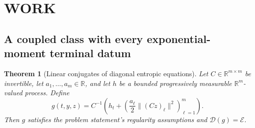 \documentclass[11pt,a4paper]{article}
\newtheorem{theorem}{Theorem}[section]
\theoremstyle{definition}
\theoremstyle{remark}
\begin{document}
\section{WORK}
\subsection{A coupled class with every exponential-moment terminal datum}
\begin{theorem}[Linear conjugates of diagonal entropic equations]
Let $C\in\mathbb R^{m\times m}$ be invertible, let $a_1,\ldots,a_m\in\mathbb R$, and let $h$ be a bounded progressively measurable $\mathbb R^m$-valued process. Define
\[
 g(t,y,z)=C^{-1}\left(h_t+
      \left(\frac{a_\ell}{2}\|(Cz)_\ell\|^2\right)_{\ell=1}^m\right).
\]
Then $g$ satisfies the problem statement's regularity assumptions and $\mathcal D(g)=\mathcal E$.
\end{theorem}
\end{document}
